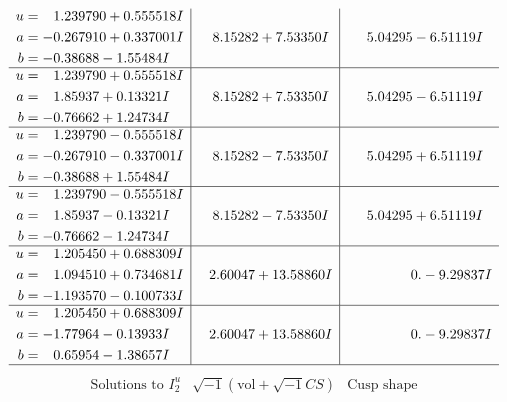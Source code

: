 \documentclass[1p]{elsarticle_modified}
\theoremstyle{definition}
\newcommand{\I}{\sqrt{-1}}
\begin{document}
$$\begin{array}{c|c|c}
\begin{aligned}
u &= \phantom{-}1.239790 + 0.555518 I \\
a &= -0.267910 + 0.337001 I \\
b &= -0.38688 - 1.55484 I\end{aligned}
 & \phantom{-}8.15282 + 7.53350 I & \phantom{-}5.04295 - 6.51119 I \\ \hline\begin{aligned}
u &= \phantom{-}1.239790 + 0.555518 I \\
a &= \phantom{-}1.85937 + 0.13321 I \\
b &= -0.76662 + 1.24734 I\end{aligned}
 & \phantom{-}8.15282 + 7.53350 I & \phantom{-}5.04295 - 6.51119 I \\ \hline\begin{aligned}
u &= \phantom{-}1.239790 - 0.555518 I \\
a &= -0.267910 - 0.337001 I \\
b &= -0.38688 + 1.55484 I\end{aligned}
 & \phantom{-}8.15282 - 7.53350 I & \phantom{-}5.04295 + 6.51119 I \\ \hline\begin{aligned}
u &= \phantom{-}1.239790 - 0.555518 I \\
a &= \phantom{-}1.85937 - 0.13321 I \\
b &= -0.76662 - 1.24734 I\end{aligned}
 & \phantom{-}8.15282 - 7.53350 I & \phantom{-}5.04295 + 6.51119 I \\ \hline\begin{aligned}
u &= \phantom{-}1.205450 + 0.688309 I \\
a &= \phantom{-}1.094510 + 0.734681 I \\
b &= -1.193570 - 0.100733 I\end{aligned}
 & \phantom{-}2.60047 + 13.58860 I & \phantom{-0.000000 } 0. - 9.29837 I \\ \hline\begin{aligned}
u &= \phantom{-}1.205450 + 0.688309 I \\
a &= -1.77964 - 0.13933 I \\
b &= \phantom{-}0.65954 - 1.38657 I\end{aligned}
 & \phantom{-}2.60047 + 13.58860 I & \phantom{-0.000000 } 0. - 9.29837 I\\
 \hline 
 \end{array}$$\newpage$$\begin{array}{c|c|c}  
\text{Solutions to }I^u_{2}& \I (\text{vol} + \sqrt{-1}CS) & \text{Cusp shape}\\

\end{array}$$
\end{document}
